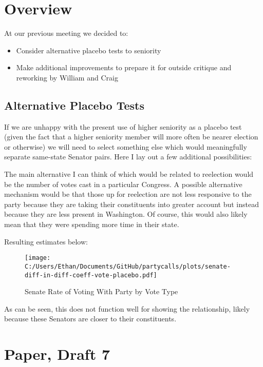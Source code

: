 \documentclass[12pt]{article}
\begin{document}
\section{Overview}

At our previous meeting we decided to:

\begin{itemize}
	\item Consider alternative placebo tests to seniority
	
	\item Make additional improvements to prepare it for outside critique and reworking by William and Craig
\end{itemize}

\subsection{Alternative Placebo Tests}

If we are unhappy with the present use of higher seniority as a placebo test (given the fact that a higher seniority member will more often be nearer election or otherwise) we will need to select something else which would meaningfully separate same-state Senator pairs. Here I lay out a few additional possibilities:

The main alternative I can think of which would be related to reelection would be the number of votes cast in a particular Congress. A possible alternative mechanism would be that those up for reelection are not less responsive to the party because they are taking their constituents into greater account but instead because they are less present in Washington. Of course, this would also likely mean that they were spending more time in their state.

Resulting estimates below:

\begin{figure}[H]
	\centering
	\caption{Senate Rate of Voting With Party by Vote Type}
	\texttt{[image: C:/Users/Ethan/Documents/GitHub/partycalls/plots/senate-diff-in-diff-coeff-vote-placebo.pdf]}
	
\end{figure}

As can be seen, this does not function well for showing the relationship, likely because these Senators are closer to their constituents. 

\clearpage

\doublespacing
	
\section{Paper, Draft 7}
\end{document}
